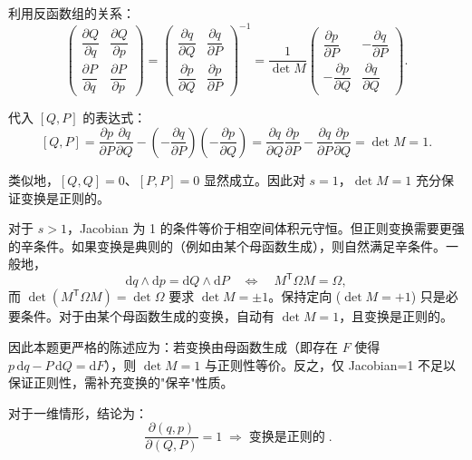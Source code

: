 \begin{question}
\begin{solution}
利用反函数组的关系：
\[
\begin{pmatrix}
\dfrac{\partial Q}{\partial q} & \dfrac{\partial Q}{\partial p} \\[8pt]
\dfrac{\partial P}{\partial q} & \dfrac{\partial P}{\partial p}
\end{pmatrix}
=
\begin{pmatrix}
\dfrac{\partial q}{\partial Q} & \dfrac{\partial q}{\partial P} \\[8pt]
\dfrac{\partial p}{\partial Q} & \dfrac{\partial p}{\partial P}
\end{pmatrix}^{-1}
= \frac{1}{\det M}
\begin{pmatrix}
\dfrac{\partial p}{\partial P} & -\dfrac{\partial q}{\partial P} \\[8pt]
-\dfrac{\partial p}{\partial Q} & \dfrac{\partial q}{\partial Q}
\end{pmatrix}.
\]

代入 \([Q,P]\) 的表达式：
\[
[Q,P] = \frac{\partial p}{\partial P}\frac{\partial q}{\partial Q}
- \left(-\frac{\partial q}{\partial P}\right)\!\left(-\frac{\partial p}{\partial Q}\right)
= \frac{\partial q}{\partial Q}\frac{\partial p}{\partial P}
- \frac{\partial q}{\partial P}\frac{\partial p}{\partial Q} = \det M = 1.
\]

类似地，\([Q,Q]=0\)、\([P,P]=0\) 显然成立。因此对 \(s=1\)，\(\det M = 1\) 充分保证变换是正则的。

对于 \(s>1\)，Jacobian 为 1 的条件等价于相空间体积元守恒。但正则变换需要更强的辛条件。如果变换是典则的（例如由某个母函数生成），则自然满足辛条件。一般地，
\[
\mathrm dq\wedge\mathrm dp = \mathrm dQ\wedge\mathrm dP \quad\Longleftrightarrow\quad M^\mathsf T \Omega M = \Omega,
\]
而 \(\det(M^\mathsf T \Omega M) = \det\Omega\) 要求 \(\det M = \pm 1\)。保持定向 (\(\det M = +1\)) 只是必要条件。对于由某个母函数生成的变换，自动有 \(\det M = 1\)，且变换是正则的。

因此本题更严格的陈述应为：若变换由母函数生成（即存在 \(F\) 使得 \(p\,\mathrm dq - P\,\mathrm dQ = \mathrm dF\)），则 \(\det M = 1\) 与正则性等价。反之，仅 Jacobian=1 不足以保证正则性，需补充变换的"保辛"性质。

对于一维情形，结论为：
\[
\boxed{\; \frac{\partial(q,p)}{\partial(Q,P)} = 1 \;\Longrightarrow\; \text{变换是正则的}\;}.
\]
\end{solution}
\end{question}

